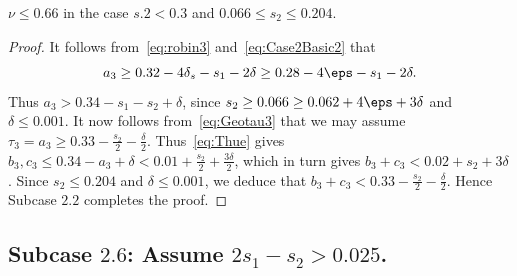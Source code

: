 \begin{lemma}\label{lem:Subcase2.5}
  \leanok
  $\nu \leq 0.66$ in the case $s.2 < 0.3$ and $0.066\leq s_2\leq 0.204$.
\end{lemma}
\begin{proof}
  \leanok
  It follows from~\eqref{eq:robin3} and~\eqref{eq:Case2Basic2} that
  \[
  a_3 \geq 0.32-4\delta_s-s_1 -2\delta \geq 0.28-4\eps-s_1 -2\delta.
  \]
  Thus
  $a_3>0.34-s_1-s_2 +\delta$, since $s_2\geq 0.066 \ge 0.062+4\eps +3\delta$ and $\delta\leq 0.001$.
  It now follows from~\eqref{eq:Geotau3} that we may assume $\tau_3=a_3 \geq 0.33
  -\frac{s_2}{2}-
  \frac{\delta}{2}$.
  Thus~\eqref{eq:Thue} gives
  $b_3,c_3 \le 0.34-a_3 +\delta< 0.01 +\frac{s_2}{2}+ \frac{3\delta}{2}$, which in turn gives
  $b_3+c_3 < 0.02+s_2 +3\delta$.
  Since $s_2\leq 0.204$ and $\delta\leq 0.001$, we deduce that
  $b_3+c_3<0.33-\frac{s_2}{2}-\frac{\delta}{2}$. Hence
  Subcase $\mathbf{2.2}$ completes the proof.
\end{proof}


\subsection*{Subcase $\mathbf{2.6}$: Assume $2s_1-s_2>0.025$.}

